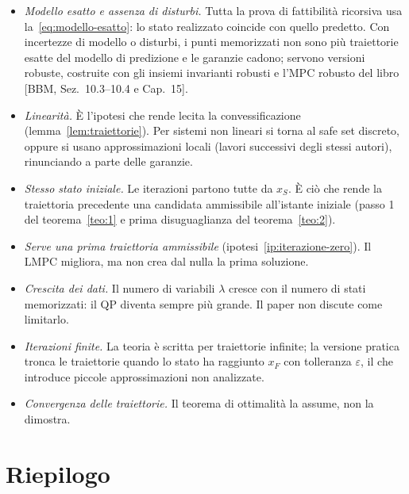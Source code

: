 \documentclass[11pt,a4paper]{article}
\theoremstyle{definition}
\theoremstyle{plain}
\theoremstyle{remark}
\newcommand{\libro}[1]{\textup{[BBM, #1]}} %
\begin{document}
\begin{itemize}
  \item \emph{Modello esatto e assenza di disturbi.} Tutta la prova di
        fattibilità ricorsiva usa la~\eqref{eq:modello-esatto}: lo stato
        realizzato coincide con quello predetto. Con incertezze di modello o
        disturbi, i punti memorizzati non sono più traiettorie esatte del
        modello di predizione e le garanzie cadono; servono versioni robuste,
        costruite con gli insiemi invarianti robusti e l'MPC robusto del libro
        \libro{Sez.~10.3--10.4 e Cap.~15}.
  \item \emph{Linearità.} È l'ipotesi che rende lecita la convessificazione
        (lemma~\ref{lem:traiettorie}). Per sistemi non lineari si torna al
        safe set discreto, oppure si usano approssimazioni locali (lavori
        successivi degli stessi autori), rinunciando a parte delle garanzie.
  \item \emph{Stesso stato iniziale.} Le iterazioni partono tutte da $x_S$. È
        ciò che rende la traiettoria precedente una candidata ammissibile
        all'istante iniziale (passo 1 del teorema~\ref{teo:1} e prima
        disuguaglianza del teorema~\ref{teo:2}).
  \item \emph{Serve una prima traiettoria ammissibile}
        (ipotesi~\ref{ip:iterazione-zero}). Il LMPC migliora, ma non crea dal
        nulla la prima soluzione.
  \item \emph{Crescita dei dati.} Il numero di variabili $\lambda$ cresce con
        il numero di stati memorizzati: il QP diventa sempre più grande. Il
        paper non discute come limitarlo.
  \item \emph{Iterazioni finite.} La teoria è scritta per traiettorie infinite;
        la versione pratica tronca le traiettorie quando lo stato ha
        raggiunto $x_F$ con tolleranza $\varepsilon$, il che introduce piccole
        approssimazioni non analizzate.
  \item \emph{Convergenza delle traiettorie.} Il teorema di ottimalità la
        assume, non la dimostra.
\end{itemize}

\section{Riepilogo}\label{sec:riepilogo}
\end{document}
